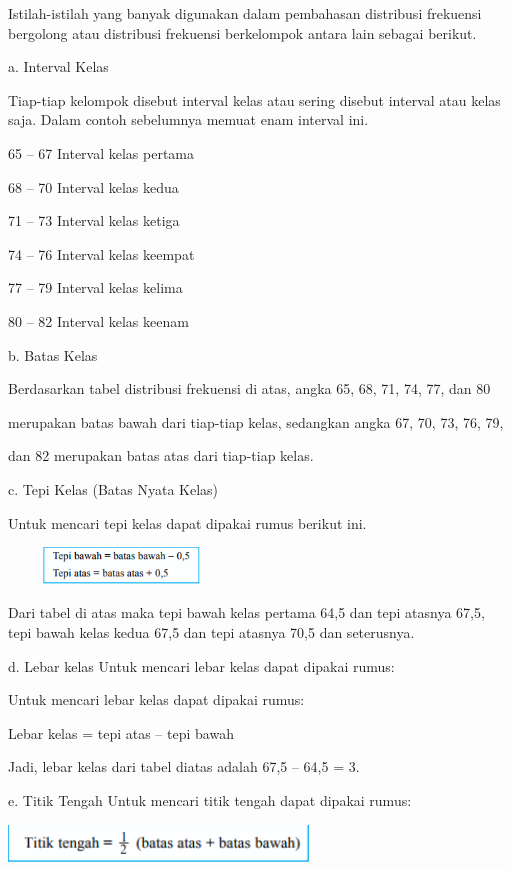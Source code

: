 \documentclass[11pt,fleqn]{book} %
\begin{document}
{Istilah-istilah yang banyak digunakan dalam pembahasan distribusi frekuensi
bergolong atau distribusi frekuensi berkelompok antara lain sebagai berikut.



a. Interval Kelas

Tiap-tiap kelompok disebut interval kelas atau sering disebut interval atau kelas
saja. Dalam contoh sebelumnya memuat enam interval ini.

65 – 67 Interval kelas pertama

68 – 70 Interval kelas kedua

71 – 73 Interval kelas ketiga

74 – 76 Interval kelas keempat

77 – 79 Interval kelas kelima

80 – 82 Interval kelas keenam


b. Batas Kelas

Berdasarkan tabel distribusi frekuensi di atas, angka 65, 68, 71, 74, 77, dan 80

merupakan batas bawah dari tiap-tiap kelas, sedangkan angka 67, 70, 73, 76, 79,

dan 82 merupakan batas atas dari tiap-tiap kelas.


c. Tepi Kelas (Batas Nyata Kelas)

Untuk mencari tepi kelas dapat dipakai rumus berikut ini.

\includegraphics[width = 6cm, height= 1cm]{Pictures/3reska.png}

Dari tabel di atas maka tepi bawah kelas pertama 64,5 dan tepi atasnya 67,5, tepi
bawah kelas kedua 67,5 dan tepi atasnya 70,5 dan seterusnya.

d. Lebar kelas
Untuk mencari lebar kelas dapat dipakai rumus:

Untuk mencari lebar kelas dapat dipakai rumus:

Lebar kelas = tepi atas – tepi bawah

Jadi, lebar kelas dari tabel diatas adalah 67,5 – 64,5 = 3.

e. Titik Tengah
Untuk mencari titik tengah dapat dipakai rumus:

\includegraphics[width = 8cm, height= 1cm]{Pictures/4reska.png}

}
\end{document}
